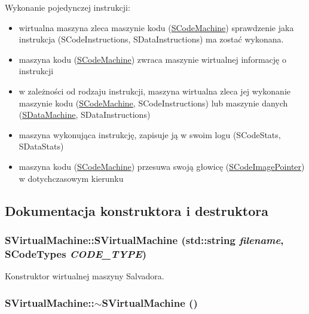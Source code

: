 Wykonanie pojedynczej instrukcji:

\begin{itemize}
\item wirtualna maszyna zleca maszynie kodu (\hyperlink{classSCodeMachine}{SCodeMachine}) sprawdzenie jaka instrukcja (SCodeInstructions, SDataInstructions) ma zostać wykonana.\item maszyna kodu (\hyperlink{classSCodeMachine}{SCodeMachine}) zwraca maszynie wirtualnej informację o instrukcji\item w zależności od rodzaju instrukcji, maszyna wirtualna zleca jej wykonanie maszynie kodu (\hyperlink{classSCodeMachine}{SCodeMachine}, SCodeInstructions) lub maszynie danych (\hyperlink{classSDataMachine}{SDataMachine}, SDataInstructions)\item maszyna wykonująca instrukcję, zapisuje ją w swoim logu (SCodeStats, SDataStats)\item maszyna kodu (\hyperlink{classSCodeMachine}{SCodeMachine}) przesuwa swoją głowicę (\hyperlink{classSCodeImagePointer}{SCodeImagePointer}) w dotychczasowym kierunku \end{itemize}


\subsection{Dokumentacja konstruktora i destruktora}
\hypertarget{classSVirtualMachine_020a4e9202a688dffed1e0d8951f9164}{
\subsubsection[{SVirtualMachine}]{\setlength{\rightskip}{0pt plus 5cm}SVirtualMachine::SVirtualMachine (std::string {\em filename}, \/  {\bf SCodeTypes} {\em CODE\_\-TYPE})}}
\label{classSVirtualMachine_020a4e9202a688dffed1e0d8951f9164}


Konstruktor wirtualnej maszyny Salvadora. \hypertarget{classSVirtualMachine_eb727bcfdf05d45526920aa512988249}{
\subsubsection[{$\sim$SVirtualMachine}]{\setlength{\rightskip}{0pt plus 5cm}SVirtualMachine::$\sim$SVirtualMachine ()}}
\label{classSVirtualMachine_eb727bcfdf05d45526920aa512988249}


